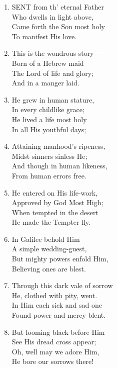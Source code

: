 \begin{enumerate}
    \item SENT from th' eternal Father \\
        Who dwells in light above, \\
        Came forth the Son most holy \\
        To manifest His love.

    \item This is the wondrous story--- \\
        Born of a Hebrew maid \\
        The Lord of life and glory; \\
        And in a manger laid.

    \item He grew in human stature, \\
        In every childlike grace; \\
        He lived a life most holy \\
        In all His youthful days;

    \item Attaining manhood's ripeness, \\
        Midst sinners sinless He; \\
        And though in human likeness, \\
        From human errors free.

    \item He entered on His life-work, \\
        Approved by God Most High; \\
        When tempted in the desert \\
        He made the Tempter fly.

    \item In Galilee behold Him \\
        A simple wedding-guest, \\
        But mighty powers enfold Him, \\
        Believing ones are blest.

    \item Through this dark vale of sorrow \\
        He, clothed with pity, went. \\
        In Him each sick and sad one \\
        Found power and mercy blent.

    \item But looming black before Him \\
        See His dread cross appear; \\
        Oh, well may we adore Him, \\
        He bore our sorrows there!


\end{enumerate}
